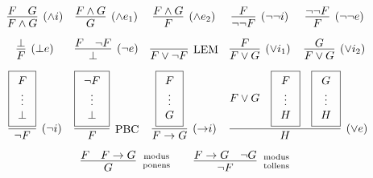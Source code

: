 
\begin{table}[hbt]
\begin{gather*}
\begin{array}{ccccc}
\infer[(\land i)]{F\land G}{F & G} 
&
\infer[(\land e_1)]{G}{F \land G} 
&
\infer[(\land e_2)]{F}{F \land G}
&
\infer[(\lnot\lnot i)]{\lnot\lnot F}{F} 
&
\infer[(\lnot\lnot e)]{F}{\lnot\lnot F}
\\[0.7em]
\infer[(\bot e)]{F}{\bot}
&
\infer[(\lnot e)]{\bot}{F & \lnot F}
&
\infer[\text{LEM}]{F\lor\lnot F}{}
&
\infer[(\lor i_1)]{F\lor G}{F}
&
\infer[(\lor i_2)]{F\lor G}{G}
\\[0.7em]
\infer[(\lnot i)]{\lnot F}{
	\boxed{\begin{array}{c}F\\\vdots\\\bot\end{array}}}
&
\infer[\text{PBC}]{F}{
	\boxed{\begin{array}{c}\lnot F\\\vdots\\\bot\end{array}}}
&
\infer[({\limp} i)]{F\limp G}{
	\boxed{\begin{array}{c}F\\\vdots\\G\end{array}
}}
&
\multicolumn{2}{l}{
	\infer[(\lor e)]{H}{
		F\lor G &
		\boxed{\begin{array}{c}F\\\vdots\\H\end{array}} &
		\boxed{\begin{array}{c}G\\\vdots\\H\end{array}}
	}	
}
\\[0.7em]
&
\multicolumn{3}{r}{
\infer[\text{modus}\atop\text{ponens}]{G}{F & F\limp G}
\qquad
\infer[\text{modus}\atop\text{tollens}]{\lnot F}{F\limp G & \lnot G}
}
&
\end{array}
\end{gather*}
\caption{Natural Deduction Rules for Connectives}
\label{tab:natural:deduction:connectives}
\end{table}
